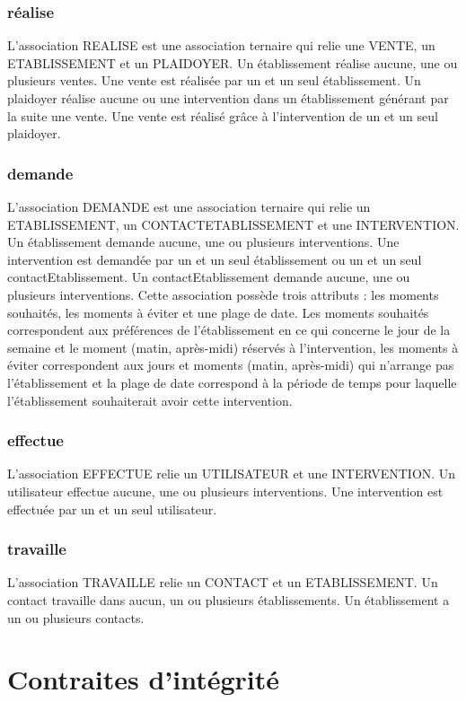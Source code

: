 \documentclass[asi, sansVersion]{picInsa}
\begin{document}
\subsection*{réalise}

L'association REALISE est une association ternaire qui relie une VENTE, un ETABLISSEMENT et un PLAIDOYER. Un établissement réalise aucune, une ou plusieurs ventes. Une vente est réalisée par un et un seul établissement. Un plaidoyer réalise aucune ou une intervention dans un établissement générant par la suite une vente. Une vente est réalisé grâce à l'intervention de un et un seul plaidoyer.


\subsection*{demande}

L'association DEMANDE est une association ternaire qui relie un ETABLISSEMENT, un CONTACTETABLISSEMENT et une INTERVENTION. Un établissement demande aucune, une ou plusieurs interventions. Une intervention est demandée par un et un seul établissement ou un et un seul contactEtablissement. Un contactEtablissement demande aucune, une ou plusieurs interventions. Cette association possède trois attributs : les moments souhaités, les moments à éviter et une plage de date. Les moments souhaités correspondent aux préférences de l'établissement en ce qui concerne le jour de la semaine et le moment (matin, après-midi) réservés à l'intervention, les moments à éviter correspondent aux jours et moments (matin, après-midi) qui n'arrange pas l'établissement et la plage de date correspond à la période de temps pour laquelle l'établissement souhaiterait avoir cette intervention. 


\subsection*{effectue} 

L'association EFFECTUE relie un UTILISATEUR et une INTERVENTION. Un utilisateur effectue aucune, une ou plusieurs interventions. Une intervention est effectuée par un et un seul utilisateur. 

\subsection*{travaille}

L'association TRAVAILLE relie un CONTACT et un ETABLISSEMENT. Un contact travaille dans aucun, un ou plusieurs établissements. Un établissement a un ou plusieurs contacts.   

\chapter{Contraites d'intégrité}
\end{document}
